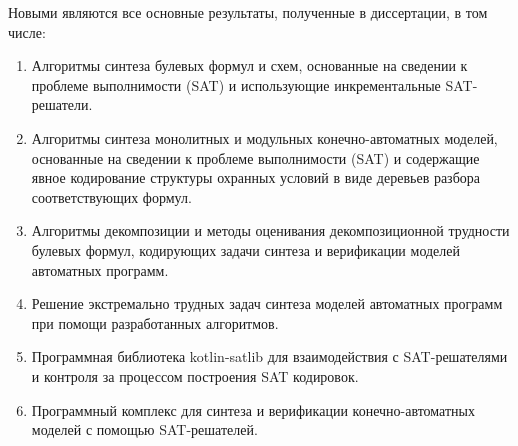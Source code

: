 \novelty
%
Новыми являются все основные результаты, полученные в диссертации, в том числе:
\begin{enumerate}[beginpenalty=10000]
    \item Алгоритмы синтеза булевых формул и схем, основанные на сведении к проблеме выполнимости (SAT) и использующие инкрементальные SAT-решатели.

    \item Алгоритмы синтеза монолитных и модульных конечно-автоматных моделей, основанные на сведении к проблеме выполнимости (SAT) и содержащие явное кодирование структуры охранных условий в виде деревьев разбора соответствующих формул.

    \item Алгоритмы декомпозиции и методы оценивания декомпозиционной трудности булевых формул, кодирующих задачи синтеза и верификации моделей автоматных программ.

    \item Решение экстремально трудных задач синтеза моделей автоматных программ при помощи разработанных алгоритмов.

    \item Программная библиотека kotlin-satlib для взаимодействия с SAT-решателями и контроля за процессом построения SAT кодировок.

    \item Программный комплекс  для синтеза и верификации конечно-автоматных моделей с помощью SAT-решателей.
\end{enumerate}


